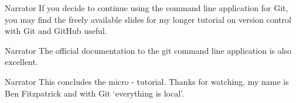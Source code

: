 \documentclass{screenplay} %
\begin{document}
\begin{dialogue}{Narrator} 
If you decide to continue using the command line application for Git, you may find the freely available slides for my longer tutorial on version control with Git and GitHub useful.
\end{dialogue}

\begin{dialogue}{Narrator} 
The official documentation to the git command line application is also excellent.
\end{dialogue}

\begin{dialogue}{Narrator}
This concludes the micro - tutorial.
Thanks for watching, my name is Ben Fitzpatrick and with Git `everything is local'.
\end{dialogue}

\fadeout
\theend
\end{document}
